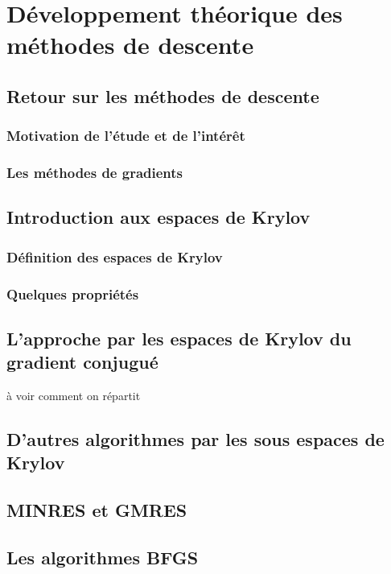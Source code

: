 \chapter{Développement théorique des méthodes de descente}
\section{Retour sur les méthodes de descente}
\subsection{Motivation de l'étude et de l'intérêt}
\subsection{Les méthodes de gradients}

\section{Introduction aux espaces de Krylov}
\subsection{Définition des espaces de Krylov}
\subsection{Quelques propriétés}

\section{L'approche par les espaces de Krylov du gradient conjugué}
à voir comment on répartit

\section{D'autres algorithmes par les sous espaces de Krylov}
\section{MINRES et GMRES}
\section{Les algorithmes BFGS}